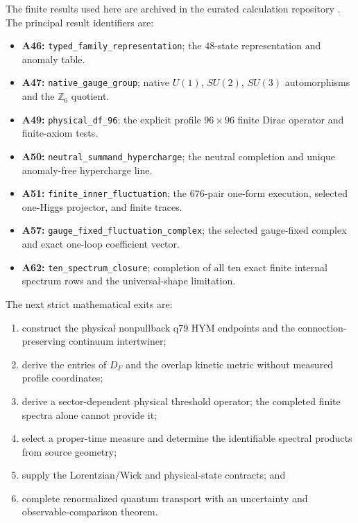 \documentclass[11pt,a4paper,twoside]{article}
\theoremstyle{plain}
\theoremstyle{definition}
\theoremstyle{remark}
\newcommand{\DF}{D_{F}}
\begin{document}
The finite results used here are archived in the curated calculation
repository \cite{MTTResultsRepro2026}.  The principal result identifiers are:
\begin{itemize}
\item \textbf{A46:} \nolinkurl{typed_family_representation};
      the $48$-state representation and anomaly table.
\item \textbf{A47:} \nolinkurl{native_gauge_group};
      native $U(1)$, $SU(2)$, $SU(3)$ automorphisms and the
      $\mathbb{Z}_6$ quotient.
\item \textbf{A49:} \nolinkurl{physical_df_96};
      the explicit profile $96\times96$ finite Dirac operator and finite-axiom
      tests.
\item \textbf{A50:} \nolinkurl{neutral_summand_hypercharge};
      the neutral completion and unique anomaly-free hypercharge line.
\item \textbf{A51:} \nolinkurl{finite_inner_fluctuation};
      the $676$-pair one-form execution, selected one-Higgs projector, and
      finite traces.
\item \textbf{A57:} \nolinkurl{gauge_fixed_fluctuation_complex};
      the selected gauge-fixed complex and exact one-loop coefficient vector.
\item \textbf{A62:} \nolinkurl{ten_spectrum_closure};
      completion of all ten exact finite internal spectrum rows and the
      universal-shape limitation.
\end{itemize}

The next strict mathematical exits are:
\begin{enumerate}
\item construct the physical nonpullback q79 HYM endpoints and the
      connection-preserving continuum intertwiner;
\item derive the entries of $\DF$ and the overlap kinetic metric without
      measured profile coordinates;
\item derive a sector-dependent physical threshold operator; the completed
      finite spectra alone cannot provide it;
\item select a proper-time measure and determine the identifiable spectral
      products from source geometry;
\item supply the Lorentzian/Wick and physical-state contracts; and
\item complete renormalized quantum transport with an uncertainty and
      observable-comparison theorem.
\end{enumerate}
\end{document}

